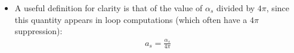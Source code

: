 \begin{itemize}
    \item
        A useful definition for clarity is that of the value of \(\alpha_s\) divided by \(4\pi\), since this quantity appears in loop computations (which often have a \(4\pi\) suppression):
        \begin{subequations}
        \begin{align}
            a_s = \frac{\alpha_s}{4\pi}
        \end{align}
        \end{subequations}
\end{itemize}
